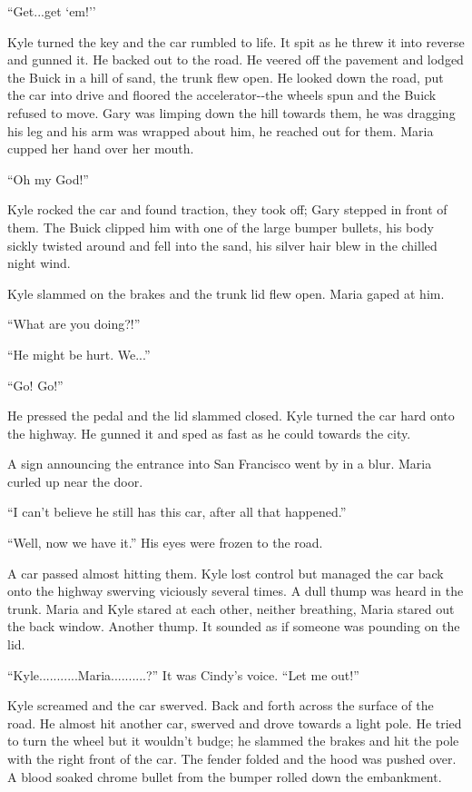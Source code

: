 ``Get...get `em!''

Kyle turned the key and the car rumbled to life. It spit as he threw it
into reverse and gunned it. He backed out to the road. He veered off the
pavement and lodged the Buick in a hill of sand, the trunk flew open. He
looked down the road, put the car into drive and floored the
accelerator-\/-the wheels spun and the Buick refused to move. Gary was
limping down the hill towards them, he was dragging his leg and his arm
was wrapped about him, he reached out for them. Maria cupped her hand
over her mouth.

``Oh my God!''

Kyle rocked the car and found traction, they took off; Gary stepped in
front of them. The Buick clipped him with one of the large bumper
bullets, his body sickly twisted around and fell into the sand, his
silver hair blew in the chilled night wind.

Kyle slammed on the brakes and the trunk lid flew open. Maria gaped at
him.

``What are you doing?!''

``He might be hurt. We...''

``Go! Go!''

He pressed the pedal and the lid slammed closed. Kyle turned the car
hard onto the highway. He gunned it and sped as fast as he could towards
the city.

A sign announcing the entrance into San Francisco went by in a blur.
Maria curled up near the door.

``I can't believe he still has this car, after all that happened.''

``Well, now we have it.'' His eyes were frozen to the road.

A car passed almost hitting them. Kyle lost control but managed the car
back onto the highway swerving viciously several times. A dull thump was
heard in the trunk. Maria and Kyle stared at each other, neither
breathing, Maria stared out the back window. Another thump. It sounded
as if someone was pounding on the lid.

``Kyle...........Maria..........?'' It was Cindy's voice. ``Let me
out!''

Kyle screamed and the car swerved. Back and forth across the surface of
the road. He almost hit another car, swerved and drove towards a light
pole. He tried to turn the wheel but it wouldn't budge; he slammed the
brakes and hit the pole with the right front of the car. The fender
folded and the hood was pushed over. A blood soaked chrome bullet from
the bumper rolled down the embankment.

